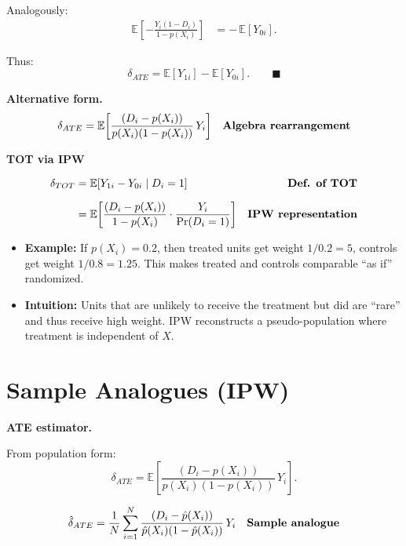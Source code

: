 \documentclass[12pt]{article}
\begin{document}
Analogously:
\singlespacing
\begin{align}
\mathbb{E}\!\left[-\frac{Y_i (1-D_i)}{1-p(X_i)}\right] 
   &= -\,\mathbb{E}[Y_{0i}].
\end{align}

Thus:
\[
\delta_{ATE} = \mathbb{E}[Y_{1i}] - \mathbb{E}[Y_{0i}].
\qquad \blacksquare
\]

\textbf{Alternative form.}
\singlespacing
\begin{align}
\delta_{ATE} 
   &= \mathbb{E}\!\left[\frac{(D_i - p(X_i))}{p(X_i)(1-p(X_i))}\,Y_i\right] 
   & \text{\textbf{Algebra rearrangement}}
\end{align}

\textbf{TOT via IPW}

\singlespacing
\begin{align}
\delta_{TOT} 
   &= \mathbb{E}[Y_{1i}-Y_{0i} \mid D_i=1] 
   & \text{\textbf{Def. of TOT}} \\[6pt]
   &= \mathbb{E}\!\left[\frac{(D_i-p(X_i))}{1-p(X_i)} \cdot \frac{Y_i}{\Pr(D_i=1)}\right] 
   & \text{\textbf{IPW representation}}
\end{align}

\begin{itemize}
    \item \textbf{Example:} If $p(X_i)=0.2$, then treated units get weight $1/0.2=5$, controls get weight $1/0.8=1.25$. This makes treated and controls comparable “as if” randomized.
    \item \textbf{Intuition:} Units that are unlikely to receive the treatment but did are “rare” and thus receive high weight. IPW reconstructs a pseudo-population where treatment is independent of $X$.
\end{itemize}

\section*{\noindent\textbf{Sample Analogues (IPW)}}

\textbf{ATE estimator.}

From population form:
\[
\delta_{ATE} 
   = \mathbb{E}\!\left[\frac{(D_i-p(X_i))}{p(X_i)(1-p(X_i))}\,Y_i\right].
\]

\singlespacing
\begin{align}
\hat{\delta}_{ATE} 
   &= \frac{1}{N}\sum_{i=1}^N 
      \frac{(D_i - \hat{p}(X_i))}{\hat{p}(X_i)(1-\hat{p}(X_i))}\,Y_i
   & \text{\textbf{Sample analogue}}
\end{align}
\end{document}

